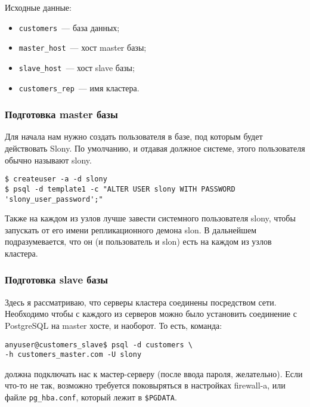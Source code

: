 Исходные данные:

\begin{itemize}
  \item \lstinline!customers!~--- база данных;
  \item \lstinline!master_host!~--- хост master базы;
  \item \lstinline!slave_host!~--- хост slave базы;
  \item \lstinline!customers_rep!~--- имя кластера.
\end{itemize}

\subsubsection{Подготовка master базы}
\label{subsec:slonyI-settings-1}

Для начала нам нужно создать пользователя в базе, под которым будет действовать Slony. По умолчанию, и отдавая должное системе, этого пользователя обычно называют slony.

\begin{lstlisting}[label=lst:slony2,caption=Подготовка master-сервера]
$ createuser -a -d slony
$ psql -d template1 -c "ALTER USER slony WITH PASSWORD 'slony_user_password';"
\end{lstlisting}

Также на каждом из узлов лучше завести системного пользователя slony, чтобы запускать от его имени репликационного демона slon. В дальнейшем подразумевается, что он (и пользователь и slon) есть на каждом из узлов кластера.

\subsubsection{Подготовка slave базы}
\label{subsec:slonyI-settings-2}

Здесь я рассматриваю, что серверы кластера соединены посредством сети. Необходимо чтобы с каждого из серверов можно было установить соединение с PostgreSQL на master хосте, и наоборот. То есть, команда:

\begin{lstlisting}[label=lst:slony3,caption=Подготовка одного slave-сервера]
anyuser@customers_slave$ psql -d customers \
-h customers_master.com -U slony
\end{lstlisting}

должна подключать нас к мастер-серверу (после ввода пароля, желательно). Если что-то не так, возможно требуется поковыряться в настройках firewall-a, или файле \lstinline!pg_hba.conf!, который лежит в \lstinline!$PGDATA!.

